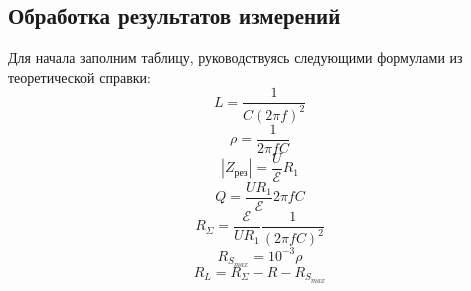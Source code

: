 	\subsection*{Обработка результатов измерений}
	Для начала заполним таблицу, руководствуясь следующими формулами из теоретической справки:
\begin{equation}
    L = \frac{1}{C(2\pi f)^2}
\end{equation}
\begin{equation}
    \rho = \frac{1}{2 \pi f C}
\end{equation}
\begin{equation}
    |Z_{\text{рез}}|=\frac{U}{\mathcal{E}}R_1
\end{equation}
\begin{equation}
    Q = \frac{UR_1}{\mathcal{E}}2 \pi fC
\end{equation}
\begin{equation}
    R_{\Sigma} = \frac{\mathcal{E}}{UR_1} \frac{1}{(2 \pi fC)^2}
\end{equation}
\begin{equation}
    R_{S_{max}} = 10^{-3} \rho
\end{equation}
\begin{equation}
    R_L = R_{\Sigma} - R - R_{S_{max}}
\end{equation}
